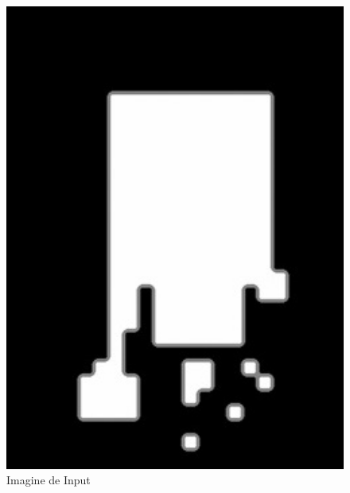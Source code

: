 \documentclass[a4paper,12pt]{report}
\begin{document}
\begin{figure}[h!]
    \centering
    \begin{minipage}{0.25\textwidth}
        \centering
        \includegraphics[width=1\textwidth]{images/input_open.jpg}
        \caption{Imagine de Input}
    \end{minipage}
    \hspace{0.05\textwidth}
    \begin{minipage}{0.25\textwidth}
        \centering

\end{minipage}
\end{figure}
\end{document}
